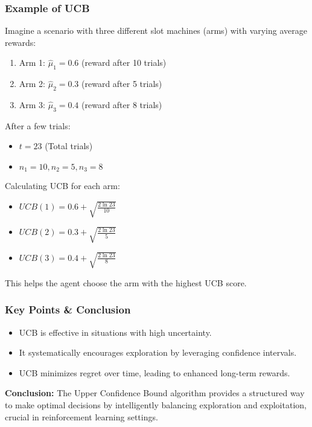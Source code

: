 \documentclass[aspectratio=169]{beamer}
\begin{document}
\begin{frame}[fragile]
    \frametitle{Example of UCB}
    Imagine a scenario with three different slot machines (arms) with varying average rewards:
    \begin{enumerate}
        \item Arm 1: \( \hat{\mu}_1 = 0.6 \) (reward after 10 trials)
        \item Arm 2: \( \hat{\mu}_2 = 0.3 \) (reward after 5 trials)
        \item Arm 3: \( \hat{\mu}_3 = 0.4 \) (reward after 8 trials)
    \end{enumerate}
    
    After a few trials:
    \begin{itemize}
        \item \( t = 23 \) (Total trials)
        \item \( n_1 = 10, n_2 = 5, n_3 = 8 \)
    \end{itemize}
    
    Calculating UCB for each arm:
    \begin{itemize}
        \item \( UCB(1) = 0.6 + \sqrt{\frac{2 \ln 23}{10}} \)
        \item \( UCB(2) = 0.3 + \sqrt{\frac{2 \ln 23}{5}} \)
        \item \( UCB(3) = 0.4 + \sqrt{\frac{2 \ln 23}{8}} \)
    \end{itemize}
    This helps the agent choose the arm with the highest UCB score.
\end{frame}

\begin{frame}[fragile]
    \frametitle{Key Points & Conclusion}
    \begin{itemize}
        \item UCB is effective in situations with high uncertainty.
        \item It systematically encourages exploration by leveraging confidence intervals.
        \item UCB minimizes regret over time, leading to enhanced long-term rewards.
    \end{itemize}

    \textbf{Conclusion:} The Upper Confidence Bound algorithm provides a structured way to make optimal decisions by intelligently balancing exploration and exploitation, crucial in reinforcement learning settings.
\end{frame}
\end{document}

